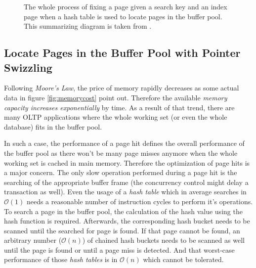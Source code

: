 \begin{@empty}
\begin{figure}[ht!]
{
		}
		\caption{The whole process of fixing a page given a search key and an index page when a hash table is used to locate pages in the buffer pool. This summarizing diagram is taken from \cite{Graefe:2014}.}
		\label{fig:locatehash}
	\end{figure}
\end{@empty}

\subsection[With Pointer Swizzling]{Locate Pages in the Buffer Pool with Pointer Swizzling} \label{subsec:conceptbufferswizzling}

	Following \emph{Moore's Law}, the price of memory rapidly decreases as some actual data in figure \ref{fig:memorycost} point out. Therefore the available \emph{memory capacity increases exponentially} by time. As a result of that trend, there are many OLTP applications where the whole working set (or even the whole database) fits in the buffer pool.
	
	In such a case, the performance of a page hit defines the overall performance of the buffer pool as there won't be many page misses anymore when the whole working set is cached in main memory. Therefore the optimization of page hits is a major concern. The only slow operation performed during a page hit is the searching of the appropriate buffer frame (the concurrency control might delay a transaction as well). Even the usage of a \emph{hash table} which in average searches in $\mathcal{O}\left(1\right)$ needs a reasonable number of instruction cycles to perform it's operations. To search a page in the buffer pool, the calculation of the hash value using the hash function is required. Afterwards, the corresponding hash bucket needs to be scanned until the searched for page is found. If that page cannot be found, an arbitrary number ($\mathcal{O}\left(n\right)$) of chained hash buckets needs to be scanned as well until the page is found or until a page miss is detected. And that worst-case performance of those \emph{hash tables} is in $\mathcal{O}\left(n\right)$ which cannot be tolerated.

